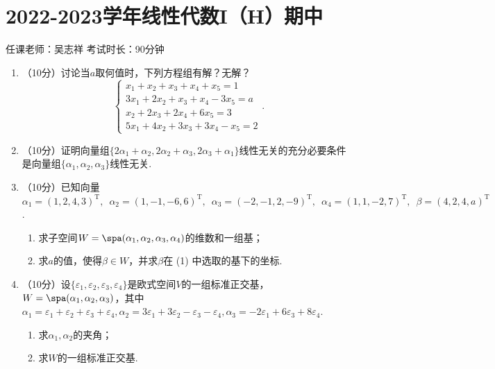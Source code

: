\section{2022-2023学年线性代数I（H）期中}

\begin{center}
    任课老师：吴志祥\hspace{4em} 考试时长：90分钟
\end{center}

\begin{enumerate}
    \item （10分）讨论当$a$取何值时，下列方程组有解？无解？
    \[\begin{cases}
        x_1+x_2+x_3+x_4+x_5=1 \\
        3x_1+2x_2+x_3+x_4-3x_5=a \\
        x_2+2x_3+2x_4+6x_5=3 \\
        5x_1+4x_2+3x_3+3x_4-x_5=2
    \end{cases}.\]

    \item （10分）证明向量组$\{2\alpha_1+\alpha_2,2\alpha_2+\alpha_3,2\alpha_3+\alpha_1\}$线性无关的充分必要条件是向量组$\{\alpha_1,\alpha_2,\alpha_3\}$线性无关.

    \item （10分）已知向量$\alpha_1=(1,2,4,3)^\mathrm{T},\enspace \alpha_2=(1,-1,-6,6)^\mathrm{T},\enspace \alpha_3=(-2,-1,2,-9)^\mathrm{T},\enspace \alpha_4=(1,1,-2,7)^\mathrm{T},\enspace \beta=(4,2,4,a)^\mathrm{T}$.
       \begin{enumerate}
        \item 求子空间$W=\spa(\alpha_1,\alpha_2,\alpha_3,\alpha_4)$的维数和一组基；

        \item 求$a$的值，使得$\beta\in W$，并求$\beta$在 (1) 中选取的基下的坐标.
    \end{enumerate}

    \item （10分）设$\{\varepsilon_1,\varepsilon_2,\varepsilon_3,\varepsilon_4\}$是欧式空间$V$的一组标准正交基，$W=\spa(\alpha_1,\alpha_2,\alpha_3)$，其中$\alpha_1=\varepsilon_1+\varepsilon_2+\varepsilon_3+\varepsilon_4,\alpha_2=3\varepsilon_1+3\varepsilon_2-\varepsilon_3-\varepsilon_4,\alpha_3=-2\varepsilon_1+6\varepsilon_3+8\varepsilon_4$.
    \begin{enumerate}
           \item 求$\alpha_1,\alpha_2$的夹角；

        \item 求$W$的一组标准正交基.
    \end{enumerate}


\end{enumerate}
